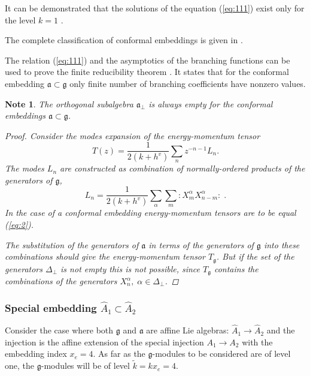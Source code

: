 \documentclass[12pt]{iopart}
\newtheorem{mynote}{Note}[section]
\theoremstyle{definition}
\begin{document}
It can be demonstrated that the solutions of the equation (\ref{eq:111}) exist only
for the level $k=1$ \cite{difrancesco1997cft}.

The complete classification of conformal embeddings is given in \cite{schellekens1986conformal}.

The relation (\ref{eq:111}) and the asymptotics of the branching functions can be used
to prove the finite reducibility theorem \cite{kac1988modular}.
It states that for the conformal embedding  $\mathfrak{a}\subset\mathfrak{g}$
only finite number of branching coefficients have nonzero values.

\begin{mynote} The orthogonal subalgebra $\mathfrak{a}_{\bot}$ is always empty for the conformal embeddings $\mathfrak{a}\subset \mathfrak{g}$.
\begin{proof}
Consider the modes expansion of the energy-momentum tensor
\begin{equation*}
\label{eq:47}
  T(z)=\frac{1}{2(k+h^v)}\sum_n z^{-n-1}L_n.
\end{equation*}
The modes $L_n$ are constructed as combination of normally-ordered products of the generators of $\mathfrak{g}$,
\begin{equation*}
\label{eq:48}
  L_n=\frac{1}{2(k+h^v)}\sum_{\alpha}\sum_m:X^{\alpha}_m X^{\alpha}_{n-m}: \; .
\end{equation*}
In the case of a conformal embedding energy-momentum tensors are to be equal (\ref{eq:2}).

The substitution of the generators of $\mathfrak{a}$  in terms of the generators of $\mathfrak{g}$ into these combinations  should give the energy-momentum tensor $T_{\mathfrak{g}}$. But if the set of the generators $\Delta_{\bot}$ is not empty this is not possible, since $T_{\mathfrak{g}}$ contains the combinations of the generators $X^{\alpha}_n, \; \alpha\in \Delta_{\bot}$.
\end{proof}
\end{mynote}
\subsubsection{Special embedding $\hat{A}_1\subset\hat{A}_2$}
\label{sec:spec-embedd-hata_1s}

Consider the case where both $\mathfrak{g}$ and $\mathfrak{a}$ are affine Lie algebras:
$\hat{A}_1 \longrightarrow \hat{A}_2$ and the injection is the affine extension of the
special injection $A_1 \longrightarrow A_2$ with the embedding index $x_e=4$.
As far as the $\mathfrak{g}$-modules to be considered are of level one,
the $\mathfrak{g}$-modules will be of level $\tilde{k}=kx_e=4$.
\end{document}
